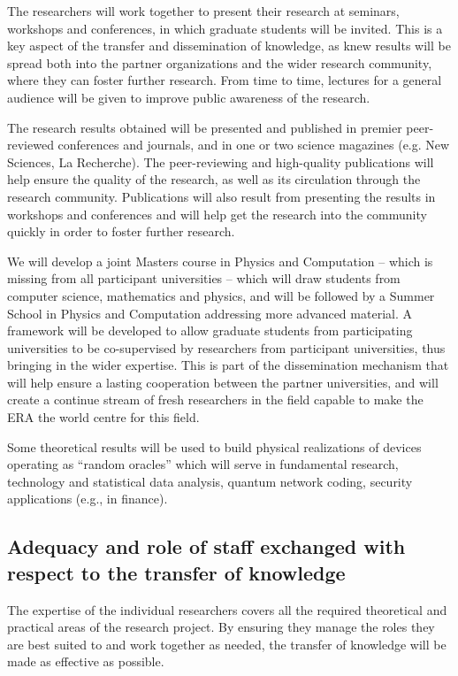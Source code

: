 \documentclass[12pt]{article}
\begin{document}
The researchers will work together to present their research at seminars, workshops and conferences, in which graduate students will be invited. This is a key aspect of the transfer and dissemination of knowledge, as knew results will be spread both into the partner organizations and the wider research community, where they can foster further research. From time to time, lectures for a general audience will be given to improve public awareness of the research.

The research results obtained will be presented and published in premier peer-reviewed conferences and journals, and in one or two science magazines (e.g. New Sciences, La Recherche). The peer-reviewing and high-quality publications will help ensure the quality of the research, as well as its circulation through the research community. Publications will also result from presenting the results in workshops and conferences and will help get the research into the community quickly in order to foster further research.

We will develop a joint Masters course in Physics and Computation -- which is missing from all participant universities -- which will draw students from
computer science, mathematics and physics, and will be followed by a Summer School in Physics and Computation addressing more advanced material. A framework will be developed to allow graduate students from participating universities to  be co-supervised by  researchers from participant universities, thus bringing in
the wider expertise. This is part of the dissemination mechanism that  will help ensure a lasting cooperation between the partner universities, and will create a continue stream of  fresh researchers in the field capable to make the ERA the world centre for this field.

Some theoretical results will be used to build physical realizations of devices operating as ``random oracles'' which will serve in fundamental research, technology and statistical data analysis, quantum network coding, security applications (e.g., in finance).


\subsection{Adequacy and role of staff exchanged with respect to the transfer of knowledge}

The expertise of the individual researchers covers all the required theoretical and practical areas of the research project. By ensuring they manage the roles they are best suited to and work together as needed, the transfer of knowledge will be made as effective as possible.
\end{document}

